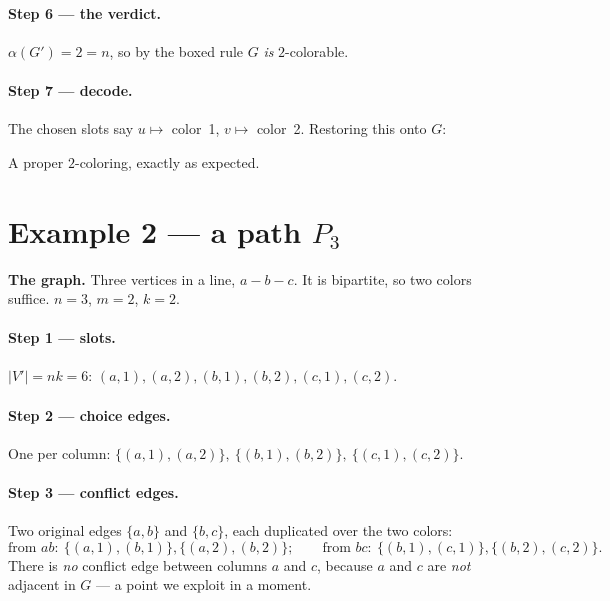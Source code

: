 \documentclass[11pt]{article}
\begin{document}
\paragraph{Step 6 --- the verdict.} $\alpha(G')=2=n$, so by the boxed rule $G$
\emph{is} $2$-colorable.

\paragraph{Step 7 --- decode.} The chosen slots say $u\mapsto$ color~1,
$v\mapsto$ color~2. Restoring this onto $G$:

\begin{center}
\end{center}
A proper $2$-coloring, exactly as expected.

\section{Example 2 --- a path \texorpdfstring{$P_3$}{P3}}

\textbf{The graph.} Three vertices in a line, $a-b-c$. It is bipartite, so two
colors suffice. $n=3$, $m=2$, $k=2$.

\begin{center}
\end{center}

\paragraph{Step 1 --- slots.} $|V'|=nk=6$: $(a,1),(a,2),(b,1),(b,2),(c,1),(c,2)$.

\paragraph{Step 2 --- choice edges.} One per column:
$\{(a,1),(a,2)\},\ \{(b,1),(b,2)\},\ \{(c,1),(c,2)\}$.

\paragraph{Step 3 --- conflict edges.} Two original edges $\{a,b\}$ and
$\{b,c\}$, each duplicated over the two colors:
\[
\text{from } ab:\ \{(a,1),(b,1)\},\{(a,2),(b,2)\};\qquad
\text{from } bc:\ \{(b,1),(c,1)\},\{(b,2),(c,2)\}.
\]
There is \emph{no} conflict edge between columns $a$ and $c$, because $a$ and $c$
are \emph{not} adjacent in $G$ --- a point we exploit in a moment.
\end{document}
